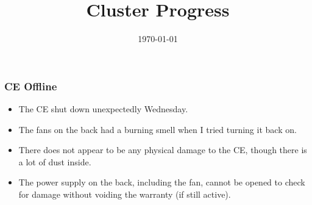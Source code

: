 \documentclass{beamer}
\title{Cluster Progress}
\date{\today}
\begin{document}

\begin{frame}
  \maketitle
\end{frame}


\begin{frame}
  \frametitle{CE Offline}

  \begin{itemize}
  \item The CE shut down unexpectedly Wednesday. 
  \item The fans on the back had a burning smell when I tried turning it back on. 
  \item There does not appear to be any physical damage to the CE, though there is a lot of dust inside.
  \item The power supply on the back, including the fan, cannot be opened to check for damage without voiding the warranty (if still active).
  \end{itemize}  
\end{frame}
\end{document}
